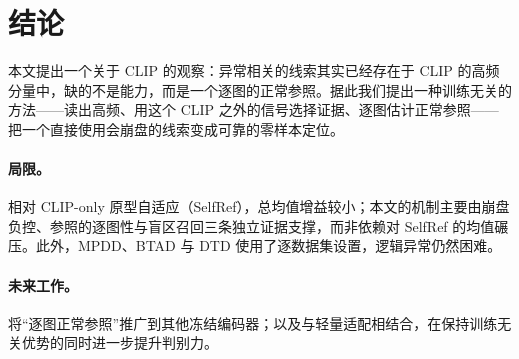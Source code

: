 \section{结论}
\label{sec:conclusion}

本文提出一个关于 CLIP 的观察：异常相关的线索其实已经存在于 CLIP 的高频分量中，缺的不是能力，而是一个逐图的正常参照。据此我们提出一种训练无关的方法——读出高频、用这个 CLIP 之外的信号选择证据、逐图估计正常参照——把一个直接使用会崩盘的线索变成可靠的零样本定位。

\paragraph{局限。}
相对 CLIP-only 原型自适应（SelfRef），总均值增益较小；本文的机制主要由崩盘负控、参照的逐图性与盲区召回三条独立证据支撑，而非依赖对 SelfRef 的均值碾压。此外，MPDD、BTAD 与 DTD 使用了逐数据集设置，逻辑异常仍然困难。

\paragraph{未来工作。}
将“逐图正常参照”推广到其他冻结编码器；以及与轻量适配相结合，在保持训练无关优势的同时进一步提升判别力。
